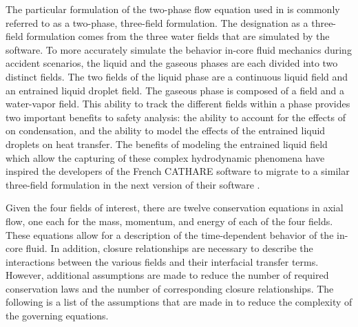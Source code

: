 The particular formulation of the two-phase flow equation used in \cobra{} is commonly referred to as a two-phase, three-field formulation.
The designation as a three-field formulation comes from the three water fields that are simulated by the software. 
To more accurately simulate the behavior in-core fluid mechanics during accident scenarios, the liquid and the gaseous phases are each divided into two distinct fields.
The two fields of the liquid phase are a continuous liquid field and an entrained liquid droplet field.
The gaseous phase is composed of a \ncg{} field and a water-vapor field. 
This ability to track the different fields within a phase provides two important benefits to safety analysis: the ability to account for the effects of \ncgs{} on condensation, and the ability to model the effects of the entrained liquid droplets on heat transfer.
The benefits of modeling the entrained liquid field which allow the capturing of these complex hydrodynamic phenomena have inspired the developers of the French CATHARE software to migrate to a similar three-field formulation in the next version of their software \cite{Emonot2011}.

Given the four fields of interest, there are twelve conservation equations in axial flow, one each for the mass, momentum, and energy of each of the four fields.
These equations allow for a description of the time-dependent behavior of the in-core fluid.
In addition, closure relationships are necessary to describe the interactions between the various fields and their interfacial transfer terms.
However, additional assumptions are made to reduce the number of required conservation laws and the number of corresponding closure relationships.
The following is a list of the assumptions that are made in \cobra{} to reduce the complexity of the governing equations.

